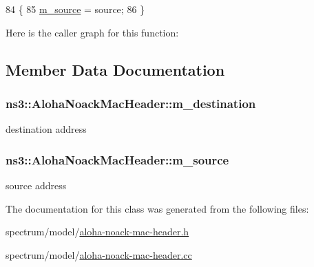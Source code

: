 \begin{DoxyCode}
84 \{
85   \hyperlink{classns3_1_1AlohaNoackMacHeader_a24cc1066db7e6df997f4d431196ceb90}{m\_source} = source;
86 \}
\end{DoxyCode}


Here is the caller graph for this function\+:




\subsection{Member Data Documentation}
\subsubsection[{\texorpdfstring{m\+\_\+destination}{m_destination}}]{ ns3\+::\+Aloha\+Noack\+Mac\+Header\+::m\+\_\+destination\hspace{0.3cm}{\ttfamily [private]}}\hypertarget{classns3_1_1AlohaNoackMacHeader_ae5c6d5fbee2afc14a37cc983c215f7e3}{}\label{classns3_1_1AlohaNoackMacHeader_ae5c6d5fbee2afc14a37cc983c215f7e3}


destination address 

\subsubsection[{\texorpdfstring{m\+\_\+source}{m_source}}]{ ns3\+::\+Aloha\+Noack\+Mac\+Header\+::m\+\_\+source\hspace{0.3cm}{\ttfamily [private]}}\hypertarget{classns3_1_1AlohaNoackMacHeader_a24cc1066db7e6df997f4d431196ceb90}{}\label{classns3_1_1AlohaNoackMacHeader_a24cc1066db7e6df997f4d431196ceb90}


source address 



The documentation for this class was generated from the following files\+:\begin{DoxyCompactItemize}
\item 
spectrum/model/\hyperlink{aloha-noack-mac-header_8h}{aloha-\/noack-\/mac-\/header.\+h}\item 
spectrum/model/\hyperlink{aloha-noack-mac-header_8cc}{aloha-\/noack-\/mac-\/header.\+cc}\end{DoxyCompactItemize}

